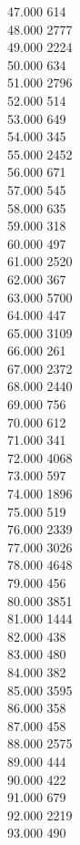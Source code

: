 { 47.000	614 \\
 48.000	2777 \\
 49.000	2224 \\
 50.000	634 \\
 51.000	2796 \\
 52.000	514 \\
 53.000	649 \\
 54.000	345 \\
 55.000	2452 \\
 56.000	671 \\
 57.000	545 \\
 58.000	635 \\
 59.000	318 \\
 60.000	497 \\
 61.000	2520 \\
 62.000	367 \\
 63.000	5700 \\
 64.000	447 \\
 65.000	3109 \\
 66.000	261 \\
 67.000	2372 \\
 68.000	2440 \\
 69.000	756 \\
 70.000	612 \\
 71.000	341 \\
 72.000	4068 \\
 73.000	597 \\
 74.000	1896 \\
 75.000	519 \\
 76.000	2339 \\
 77.000	3026 \\
 78.000	4648 \\
 79.000	456 \\
 80.000	3851 \\
 81.000	1444 \\
 82.000	438 \\
 83.000	480 \\
 84.000	382 \\
 85.000	3595 \\
 86.000	358 \\
 87.000	458 \\
 88.000	2575 \\
 89.000	444 \\
 90.000	422 \\
 91.000	679 \\
 92.000	2219 \\
 93.000	490 \\
}
